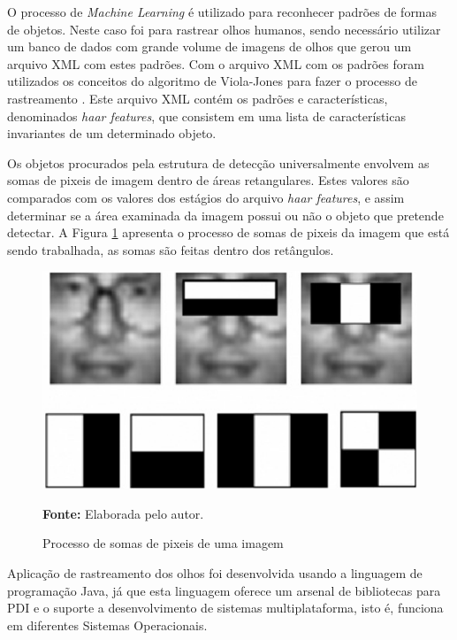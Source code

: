 O processo de \textit{Machine Learning} é utilizado para reconhecer padrões de formas de objetos. Neste caso foi para rastrear olhos humanos, sendo  necessário utilizar um banco de dados com grande volume de imagens de olhos que gerou um arquivo XML com estes padrões. Com o arquivo XML com os padrões foram utilizados os conceitos do algoritmo de Viola-Jones para fazer o processo de rastreamento \cite{viola2001rapid}. Este arquivo XML contém os padrões e características, denominados \textit{haar features}, que consistem em uma lista de características invariantes de um determinado objeto.

Os objetos procurados pela estrutura de detecção universalmente envolvem as somas de pixeis de imagem dentro de áreas retangulares. Estes valores são comparados com os valores dos estágios do arquivo \textit{haar features}, e assim determinar se a área examinada da imagem possui ou não o objeto que pretende detectar. A Figura \ref{fig:viola-jones-ret} apresenta o processo de somas de pixeis da imagem que está sendo trabalhada, as somas são feitas dentro dos retângulos. 

\begin{figure}[H]
\caption{Processo de somas de pixeis de uma imagem} 
\centering \includegraphics[scale=0.6]{img/viola-jones-ret.png}

{\fontsize{11}{11}\selectfont \textbf{Fonte:} Elaborada pelo autor.}
\label{fig:viola-jones-ret}
\end{figure}

Aplicação de rastreamento dos olhos foi desenvolvida usando a linguagem de programação Java, já que esta linguagem oferece um arsenal de bibliotecas para PDI e o suporte a desenvolvimento de sistemas multiplataforma, isto é, funciona em diferentes Sistemas Operacionais. 

